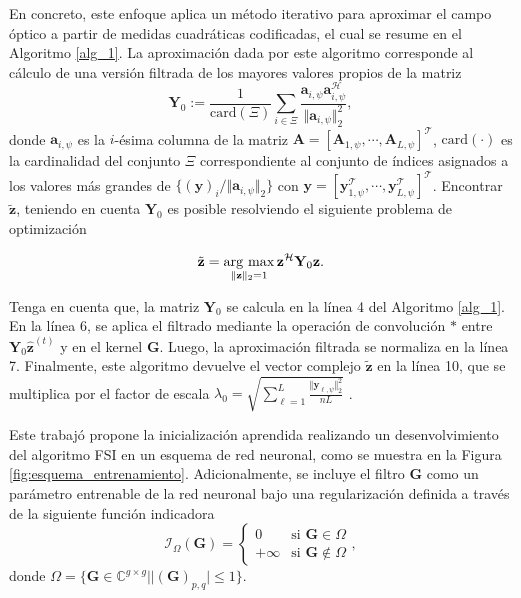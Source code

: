 En concreto, este enfoque aplica un método iterativo para aproximar el campo óptico a partir de medidas cuadráticas codificadas, el cual se resume en el Algoritmo \ref{alg_1}. La aproximación dada por este algoritmo corresponde al cálculo de una versión filtrada de los mayores valores propios de la matriz
\begin{equation}
\mathbf{Y}_{0}:=\frac{1}{\mathrm{card}(\Xi)}\sum_{i\in\Xi}\frac{\mathbf{a}_{i,\psi}\mathbf{a}_{i,\psi}^\mathcal{H}}{\Vert\mathbf{a}_{i,\psi}\Vert_2^2},\label{eq:YO}
\end{equation}
donde $\mathbf{a}_{i,\psi}$ es la $i$-ésima columna de la matriz $\mathbf{A}=[\mathbf{A}_{1,\psi},\cdots,\mathbf{A}_{L,\psi}]^\mathcal{T}$, $\mathrm{card}(\cdot)$ es la cardinalidad del conjunto $\Xi$ correspondiente al conjunto de índices asignados a los valores más grandes de $\{(\mathbf{y})_i / \Vert \mathbf{a}_{i,\psi}\Vert_{2}\}$ con $\mathbf{y}=[\mathbf{y}_{1,\psi}^\mathcal{T},\cdots,\mathbf{y}_{L,\psi}^\mathcal{T}]^\mathcal{T}$.  Encontrar $\tilde{\mathbf{z}}$, teniendo en cuenta $\mathbf{Y}_0$ es posible resolviendo el siguiente problema de optimización


\begin{equation}
    \tilde{\mathbf{z}}=\operatorname*{arg \ max}_{\Vert{\mathbf{z}}\Vert_2=1}{\mathbf{z}}^\mathcal{H}\mathbf{Y}_{0}{\mathbf{z}}.
\end{equation}


Tenga en cuenta que, la matriz $\mathbf{Y}_{0}$ se calcula en la línea 4 del Algoritmo \ref{alg_1}. En la línea 6, se aplica el filtrado mediante la operación de convolución $*$ entre $\mathbf{Y}_{0}\hat{\mathbf{z}}^{(t)}$ y en el kernel $\mathbf{G}$. Luego, la aproximación filtrada se normaliza en la línea 7. Finalmente, este algoritmo devuelve el vector complejo $\tilde{\mathbf{z}}$ en la línea 10, que se multiplica por el factor de escala $\lambda_0=\sqrt{\sum_{\ell=1}^{L}\frac{\Vert\mathbf{y}_{\ell,\psi}\Vert_{2}^2}{nL}}$ . %
  

Este trabajó propone la inicialización aprendida realizando un desenvolvimiento del algoritmo FSI en un esquema de red neuronal, como se muestra en la Figura \ref{fig:esquema_entrenamiento}. Adicionalmente, se incluye el filtro $\mathbf{G}$ como un parámetro entrenable de la red neuronal bajo una regularización definida a través de la siguiente función indicadora
\begin{equation}
  \mathcal{I}_{\Omega}(\mathbf{G})=  \left\{\begin{matrix}
 0& \text{si } \mathbf{G}\in \Omega \\ 
+\infty & \text{si } \mathbf{G}\notin \Omega 
\end{matrix}\right., \label{eq:regularizationG}
\end{equation}
donde $\Omega=\{\mathbf{G}\in\mathbb{C}^{g\times g}| |(\mathbf{G})_{p,q}|\leq 1\}$. 


